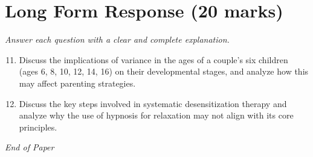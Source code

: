 \documentclass[12pt]{article}
\begin{document}
\section*{Long Form Response (20 marks)}
\textit{Answer each question with a clear and complete explanation.}
\begin{enumerate}[label=\arabic*.]
\setcounter{enumi}{10}
\item Discuss the implications of variance in the ages of a couple's six children (ages 6, 8,
10, 12, 14, 16) on their developmental stages, and analyze how this may affect parenting
strategies.
\item Discuss the key steps involved in systematic desensitization therapy and analyze why the
use of hypnosis for relaxation may not align with its core principles.
\end{enumerate}

\vfill
\noindent\textit{End of Paper}
\end{document}
